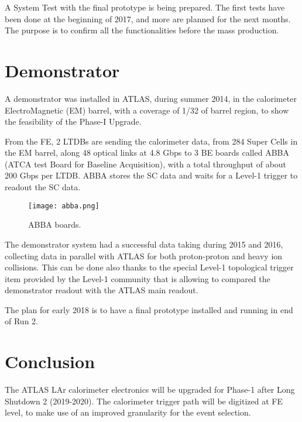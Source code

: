 \documentclass{llncs}
\begin{document}
A System Test with the final prototype is being prepared. The first tests have been done at the beginning of 2017, and more are planned for the next months. The purpose is to confirm all the functionalities before the mass production.

\section{Demonstrator}
A demonstrator was installed in ATLAS, during summer 2014, in the calorimeter ElectroMagnetic (EM) barrel, with a coverage of 1/32 of barrel region,  to show the feasibility of the Phase-I Upgrade.

From the FE, 2 LTDBs are sending the calorimeter data, from 284 Super Cells in the EM barrel, along 48 optical links at 4.8 Gbps to 3 BE boards called ABBA (ATCA test Board for Baseline Acquisition), with a total throughput of about 200 Gbps per LTDB. ABBA stores the SC data and waits for a Level-1 trigger to readout the SC data.

\begin{wrapfigure}{r}{0.35\textwidth}
\vspace{-20pt}
	\centering
	\texttt{[image: abba.png]}
	\caption{ABBA boards.}
	\label{fig:abba}
 \vspace{-20pt}
\end{wrapfigure}
The demonstrator system had a successful data taking during 2015 and 2016, collecting data in parallel with ATLAS for both proton-proton and heavy ion collisions. This can be done also thanks to the special Level-1 topological trigger item provided by the Level-1 community that is allowing to compared the demonstrator readout with the ATLAS main readout.

The plan for early 2018 is to have a final prototype installed and running in end of Run 2.

\section{Conclusion}
The ATLAS LAr calorimeter electronics will be upgraded for Phase-1 after Long Shutdown 2 (2019-2020). The calorimeter trigger path will be digitized at FE level, to make use of an improved granularity for the event selection.
\end{document}
